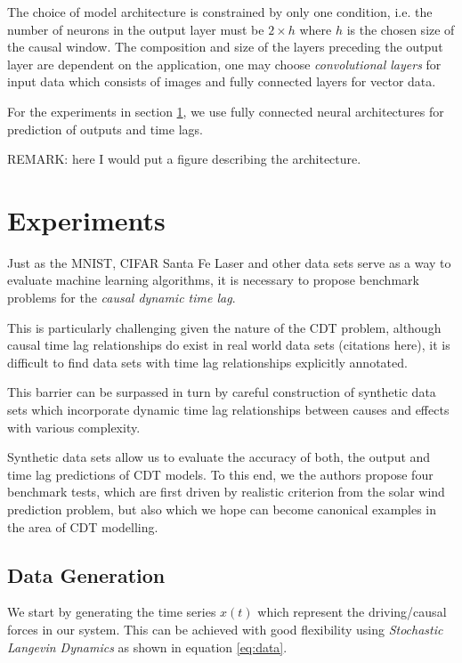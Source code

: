 \documentclass[twoside]{article}
\begin{document}
The choice of model architecture is constrained by only one condition, i.e. the number of neurons in the output layer 
must be $2 \times h$ where $h$ is the chosen size of the causal window. The composition and size of the layers preceding
the output layer are dependent on the application, one may choose \emph{convolutional layers} for input data which consists
of images and fully connected layers for vector data.

For the experiments in section \ref{sec:exp}, we use fully connected neural architectures for prediction of outputs and time lags.

REMARK: here I would put a figure describing the architecture.

\section{Experiments}\label{sec:exp}


Just as the MNIST, CIFAR Santa Fe Laser and other data sets serve as a way to evaluate machine learning
algorithms, it is necessary to propose benchmark problems for the \emph{causal dynamic time lag}.

This is particularly challenging given the nature of the CDT problem, although causal time lag
relationships do exist in real world data sets (citations here), it is difficult to find data sets
with time lag relationships explicitly annotated.

This barrier can be surpassed in turn by careful construction of synthetic data sets which incorporate dynamic time lag
relationships between causes and effects with various complexity.

Synthetic data sets allow us to evaluate the accuracy of both, the output and time lag predictions of CDT models. 
To this end, we the authors propose four benchmark tests, which are first driven by realistic criterion from the 
solar wind prediction problem, but also which we hope can become canonical examples in the area of CDT modelling.

\subsection{Data Generation}

We start by generating the time series $x(t)$ which represent the driving/causal
forces in our system. This can be achieved with good flexibility using 
\emph{Stochastic Langevin Dynamics} as shown in equation \ref{eq:data}. 
\end{document}
